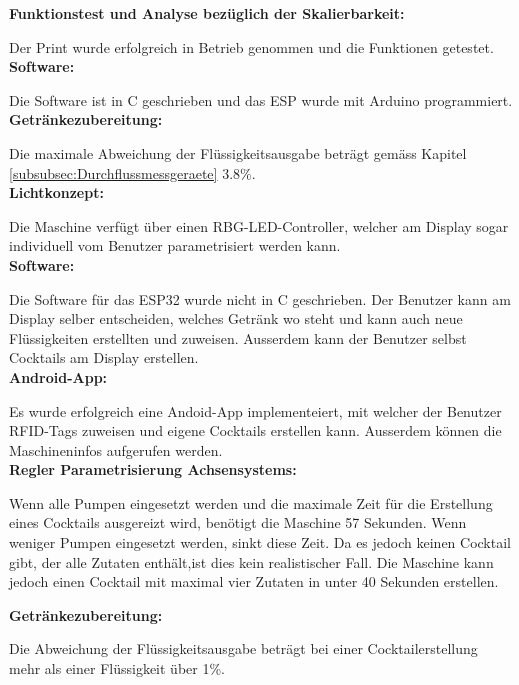 \textbf{Funktionstest und Analyse bezüglich der Skalierbarkeit:}

Der Print wurde erfolgreich in Betrieb genommen und die Funktionen getestet.\\

\textbf{Software:}

Die Software ist in C geschrieben und das ESP wurde mit Arduino programmiert.\\

\textbf{Getränkezubereitung:}

Die maximale Abweichung der Flüssigkeitsausgabe beträgt gemäss Kapitel \ref{subsubsec:Durchflussmessgeraete} 3.8\%.\\

\textbf{Lichtkonzept:}

Die Maschine verfügt über einen RBG-LED-Controller, welcher am Display sogar individuell vom Benutzer parametrisiert werden kann.\\

\textbf{Software:}

Die Software für das ESP32 wurde nicht in C geschrieben. Der Benutzer kann am Display selber entscheiden, welches Getränk wo steht und kann auch neue Flüssigkeiten erstellten und zuweisen. Ausserdem kann der Benutzer selbst Cocktails am Display erstellen.\\

\textbf{Android-App:}

Es wurde erfolgreich eine Andoid-App implementeiert, mit welcher der Benutzer RFID-Tags zuweisen und eigene Cocktails erstellen kann. Ausserdem können die Maschineninfos aufgerufen werden.\\

\textbf{Regler Parametrisierung Achsensystems:}

Wenn alle Pumpen eingesetzt werden und die maximale Zeit für die Erstellung eines Cocktails ausgereizt wird, benötigt die Maschine 57 Sekunden. Wenn weniger Pumpen eingesetzt werden, sinkt diese Zeit. Da es jedoch keinen Cocktail gibt, der alle Zutaten enthält,ist dies kein realistischer Fall. Die Maschine kann jedoch einen Cocktail mit maximal vier Zutaten in unter 40 Sekunden erstellen.

\textbf{Getränkezubereitung:}

Die Abweichung der Flüssigkeitsausgabe beträgt bei einer Cocktailerstellung mehr als einer Flüssigkeit über 1\%.